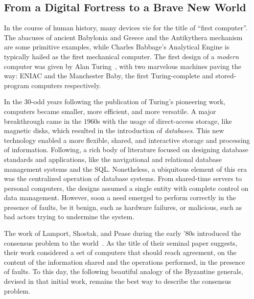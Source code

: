 \subsection*{From a Digital Fortress to a Brave New World}
In the course of human history, many devices vie for the title of ``first
computer''. The abacuses of ancient Babylonia and Greece and the Antikythera
mechanism are some primitive examples, while Charles
Babbage's Analytical Engine is typically hailed as the first mechanical
computer. The first design of a \emph{modern} computer was given by Alan
Turing~\cite{turing1937computable}, with two marvelous machines paving the way:
ENIAC and the Manchester Baby, the first Turing-complete and
stored-program computers respectively.

In the $30$-odd years following the publication of Turing's pioneering work, computers
became smaller, more efficient, and more versatile. A major breakthrough came
in the $1960$s with the usage of direct-access storage, like magnetic disks,
which resulted in the introduction of \emph{databases}. This new technology
enabled a more flexible, shared, and interactive storage and processing of
information. Following, a rich body of literature focused on designing database
standards and applications, like the navigational and relational database
management systems and the SQL.  Nonetheless, a ubiquitous element of this era
was the centralized operation of database systems. From shared-time servers to
personal computers, the designs assumed a single entity with complete control
on data management. However, soon a need emerged to perform correctly in the
presence of faults, be it benign, such as hardware failures, or malicious, such
as bad actors trying to undermine the system.

The work of Lamport, Shostak, and Pease during the early '$80$s introduced the
consensus problem to the world~\cite{pease1980reaching,lamport1982byzantine}.
As the title of their seminal paper suggests, their work considered a set of
computers that should reach agreement, on the content of the information shared
and the operations performed, in the presence of faults. To this day, the
following beautiful analogy of the Byzantine generals, devised in that initial
work, remains the best way to describe the consensus problem.

